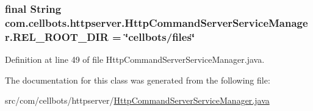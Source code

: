 \hypertarget{classcom_1_1cellbots_1_1httpserver_1_1_http_command_server_service_manager_a83a6e0d5243779bce31bb6b1b74c6356}{
\subsubsection[{R\-E\-L\-\_\-\-R\-O\-O\-T\-\_\-\-D\-I\-R}]{\setlength{\rightskip}{0pt plus 5cm}final String {\bf com.\-cellbots.\-httpserver.\-Http\-Command\-Server\-Service\-Manager.\-R\-E\-L\-\_\-\-R\-O\-O\-T\-\_\-\-D\-I\-R} = \char`\"{}cellbots/files\char`\"{}}}\label{classcom_1_1cellbots_1_1httpserver_1_1_http_command_server_service_manager_a83a6e0d5243779bce31bb6b1b74c6356}


Definition at line 49 of file Http\-Command\-Server\-Service\-Manager.\-java.



The documentation for this class was generated from the following file\-:\begin{DoxyCompactItemize}
\item 
src/com/cellbots/httpserver/\hyperlink{_http_command_server_service_manager_8java}{Http\-Command\-Server\-Service\-Manager.\-java}\end{DoxyCompactItemize}
